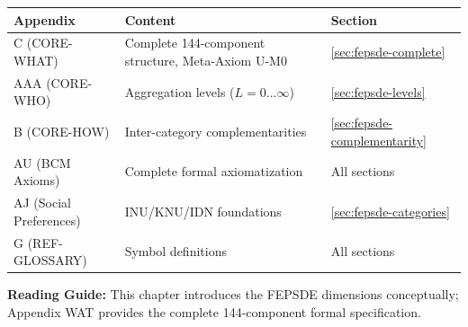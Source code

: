 \begin{tcolorbox}[
    colback=yellow!10!white,
    colframe=orange!75!black,
    title={\textbf{Appendix References for This Chapter}},
    fonttitle=\bfseries
]
\begin{tabular}{lll}
\textbf{Appendix} & \textbf{Content} & \textbf{Section} \\
\midrule
C (CORE-WHAT) & Complete 144-component structure, Meta-Axiom U-M0 & \ref{sec:fepsde-complete} \\
AAA (CORE-WHO) & Aggregation levels ($L = 0...\infty$) & \ref{sec:fepsde-levels} \\
B (CORE-HOW) & Inter-category complementarities & \ref{sec:fepsde-complementarity} \\
AU (BCM Axioms) & Complete formal axiomatization & All sections \\
AJ (Social Preferences) & INU/KNU/IDN foundations & \ref{sec:fepsde-categories} \\
G (REF-GLOSSARY) & Symbol definitions & All sections
\end{tabular}

\medskip
\textbf{Reading Guide:} This chapter introduces the FEPSDE dimensions conceptually;
Appendix WAT provides the complete 144-component formal specification.
\end{tcolorbox}

